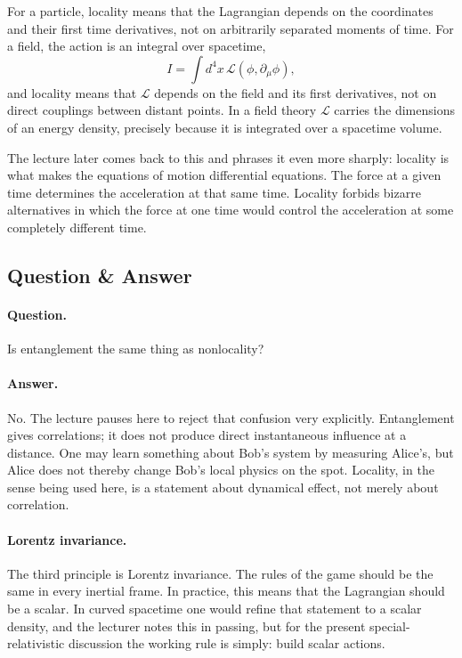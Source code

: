 For a particle, locality means that the Lagrangian depends on the coordinates and their first time derivatives, not on arbitrarily separated moments of time. For a field, the action is an integral over spacetime,
\begin{equation}
I=\int d^4x\,\mathcal L(\phi,\partial_\mu\phi),
\end{equation}
and locality means that \(\mathcal L\) depends on the field and its first derivatives, not on direct couplings between distant points. In a field theory \(\mathcal L\) carries the dimensions of an energy density, precisely because it is integrated over a spacetime volume.

The lecture later comes back to this and phrases it even more sharply: locality is what makes the equations of motion differential equations. The force at a given time determines the acceleration at that same time. Locality forbids bizarre alternatives in which the force at one time would control the acceleration at some completely different time.

\subsection{Question \& Answer}

\paragraph{Question.}
Is entanglement the same thing as nonlocality?

\paragraph{Answer.}
No. The lecture pauses here to reject that confusion very explicitly. Entanglement gives correlations; it does not produce direct instantaneous influence at a distance. One may learn something about Bob's system by measuring Alice's, but Alice does not thereby change Bob's local physics on the spot. Locality, in the sense being used here, is a statement about dynamical effect, not merely about correlation.

\paragraph{Lorentz invariance.}
The third principle is Lorentz invariance. The rules of the game should be the same in every inertial frame. In practice, this means that the Lagrangian should be a scalar. In curved spacetime one would refine that statement to a scalar density, and the lecturer notes this in passing, but for the present special-relativistic discussion the working rule is simply: build scalar actions.

